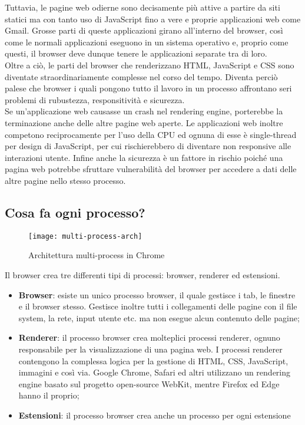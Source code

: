 Tuttavia, le pagine web odierne sono decisamente più attive a partire da siti statici ma con tanto uso di JavaScript fino a vere e proprie applicazioni web come Gmail. Grosse parti di queste applicazioni girano all'interno del browser, così come le normali applicazioni eseguono in un sistema operativo e, proprio come questi, il browser deve dunque tenere le applicazioni separate tra di loro. \\

Oltre a ciò, le parti del browser che renderizzano HTML, JavaScript e CSS sono diventate straordinariamente complesse nel corso del tempo. Diventa perciò palese che browser i quali pongono tutto il lavoro in un processo affrontano seri problemi di rubustezza, responsitività e sicurezza. \\

Se un'applicazione web causasse un crash nel rendering engine, porterebbe la terminazione anche delle altre pagine web aperte. Le applicazioni web inoltre competono reciprocamente per l'uso della CPU ed ognuna di esse è single-thread per design di JavaScript, per cui rischierebbero di diventare non responsive alle interazioni utente. Infine anche la sicurezza è un fattore in rischio poiché una pagina web potrebbe sfruttare vulnerabilità del browser per accedere a dati delle altre pagine nello stesso processo.

\subsection{Cosa fa ogni processo?}

\begin{figure}[H] 
    \centering 
    \texttt{[image: multi-process-arch]} 
    \caption{Architettura multi-process in Chrome}
\end{figure}

Il browser crea tre differenti tipi di processi: browser, renderer ed estensioni.

\begin{itemize}
    \item \textbf{Browser}: esiste un unico processo browser, il quale gestisce i tab, le finestre e il browser stesso. Gestisce inoltre tutti i collegamenti delle pagine con il file system, la rete, input utente etc. ma non esegue alcun contenuto delle pagine;
    \item \textbf{Renderer}: il processo browser crea molteplici processi renderer, ognuno responsabile per la visualizzazione di una pagina web. I processi renderer contengono la complessa logica per la gestione di HTML, CSS, JavaScript, immagini e così via. Google Chrome, Safari ed altri utilizzano un rendering engine basato sul progetto open-source WebKit, mentre Firefox ed Edge hanno il proprio;
    \item \textbf{Estensioni}: il processo browser crea anche un processo per ogni estensione
\end{itemize}

